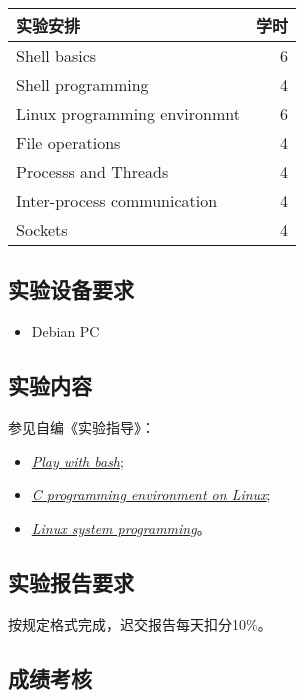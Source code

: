 \documentclass{wx672ctexart}
\begin{document}
\begin{center}
  \begin{tabular}{lr}
    \hline
    实验安排 & 学时\\
    \hline
    Shell basics&6\\
    Shell programming&4\\
    Linux programming environmnt&6\\
    File operations&4\\
    Processs and Threads&4\\
    Inter-process communication&4\\
    Sockets&4\\
    \hline
  \end{tabular}
\end{center}

\subsection{实验设备要求}
\label{sec-3-3}

\begin{itemize}
\item Debian PC
\end{itemize}

\subsection{实验内容}
\label{sec-3-4}

参见自编《实验指导》：
\begin{itemize}
\item
  \href{https://cs6.swfu.edu.cn/~wx672/lecture_notes/linux/bash/shell_basics.html}{\emph{Play
    with bash}};
\item \href{https://cs6.swfu.edu.cn/~wx672/lecture_notes/linux/c/c_dev.html}{\emph{C programming
  environment on Linux}};
\item \href{http://cs6.swfu.edu.cn/~wx672/lecture_notes/os/lab.html}{\emph{Linux system programming}}。
\end{itemize}

\subsection{实验报告要求}
\label{sec-3-5}

按规定格式完成，迟交报告每天扣分10\%。

\subsection{成绩考核}
\label{sec-3-6}
\end{document}
